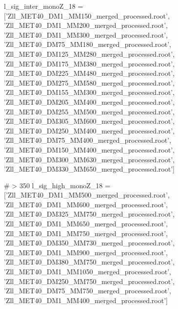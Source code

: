 l_sig_inter_monoZ_18 = ['Zll_MET40_DM1_MM150_merged_processed.root',
                     'Zll_MET40_DM1_MM200_merged_processed.root',
                     'Zll_MET40_DM1_MM300_merged_processed.root',
                     'Zll_MET40_DM75_MM180_merged_processed.root',
                     'Zll_MET40_DM125_MM280_merged_processed.root',
                     'Zll_MET40_DM175_MM380_merged_processed.root',
                     'Zll_MET40_DM225_MM480_merged_processed.root',
                     'Zll_MET40_DM275_MM580_merged_processed.root',
                     'Zll_MET40_DM155_MM300_merged_processed.root',
                     'Zll_MET40_DM205_MM400_merged_processed.root',
                     'Zll_MET40_DM255_MM500_merged_processed.root',
                     'Zll_MET40_DM305_MM600_merged_processed.root',
                     'Zll_MET40_DM250_MM400_merged_processed.root',
                     'Zll_MET40_DM75_MM400_merged_processed.root',
                     'Zll_MET40_DM150_MM400_merged_processed.root',
                     'Zll_MET40_DM300_MM630_merged_processed.root',
                     'Zll_MET40_DM330_MM650_merged_processed.root']



   
# > 350
l_sig_high_monoZ_18 = ['Zll_MET40_DM1_MM500_merged_processed.root',
                    'Zll_MET40_DM1_MM600_merged_processed.root',    
                    'Zll_MET40_DM325_MM750_merged_processed.root',
                    'Zll_MET40_DM1_MM650_merged_processed.root',
                    'Zll_MET40_DM1_MM750_merged_processed.root',    
                    'Zll_MET40_DM350_MM730_merged_processed.root',
                    'Zll_MET40_DM1_MM900_merged_processed.root',    
                    'Zll_MET40_DM380_MM750_merged_processed.root',
                    'Zll_MET40_DM1_MM1050_merged_processed.root',   
                    'Zll_MET40_DM250_MM750_merged_processed.root',  
                    'Zll_MET40_DM75_MM750_merged_processed.root',
                    'Zll_MET40_DM1_MM400_merged_processed.root']








































